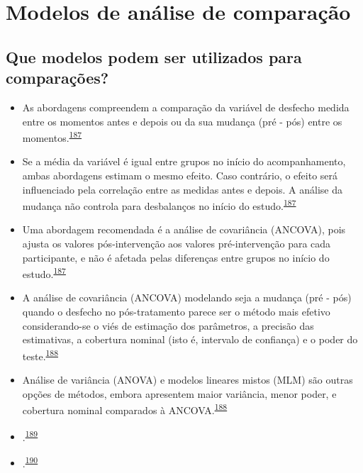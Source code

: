 \documentclass[
  a4paper,
]{book}
\begin{document}
\hypertarget{metodos-comparacao}{%
\section{Modelos de análise de comparação}\label{metodos-comparacao}}

\hypertarget{que-modelos-podem-ser-utilizados-para-comparauxe7uxf5es}{%
\subsection{Que modelos podem ser utilizados para comparações?}\label{que-modelos-podem-ser-utilizados-para-comparauxe7uxf5es}}

\begin{itemize}
\item
  As abordagens compreendem a comparação da variável de desfecho medida entre os momentos antes e depois ou da sua mudança (pré - pós) entre os momentos.\textsuperscript{\protect\hyperlink{ref-Vickers2001}{187}}
\item
  Se a média da variável é igual entre grupos no início do acompanhamento, ambas abordagens estimam o mesmo efeito. Caso contrário, o efeito será influenciado pela correlação entre as medidas antes e depois. A análise da mudança não controla para desbalanços no início do estudo.\textsuperscript{\protect\hyperlink{ref-Vickers2001}{187}}
\item
  Uma abordagem recomendada é a análise de covariância (ANCOVA), pois ajusta os valores pós-intervenção aos valores pré-intervenção para cada participante, e não é afetada pelas diferenças entre grupos no início do estudo.\textsuperscript{\protect\hyperlink{ref-Vickers2001}{187}}
\item
  A análise de covariância (ANCOVA) modelando seja a mudança (pré - pós) quando o desfecho no pós-tratamento parece ser o método mais efetivo considerando-se o viés de estimação dos parâmetros, a precisão das estimativas, a cobertura nominal (isto é, intervalo de confiança) e o poder do teste.\textsuperscript{\protect\hyperlink{ref-OConnell2017}{188}}
\item
  Análise de variância (ANOVA) e modelos lineares mistos (MLM) são outras opções de métodos, embora apresentem maior variância, menor poder, e cobertura nominal comparados à ANCOVA.\textsuperscript{\protect\hyperlink{ref-OConnell2017}{188}}
\item
  .\textsuperscript{\protect\hyperlink{ref-Cnaan1997}{189}}
\item
  .\textsuperscript{\protect\hyperlink{ref-mallinckrodt2008}{190}}
\end{itemize}
\end{document}
